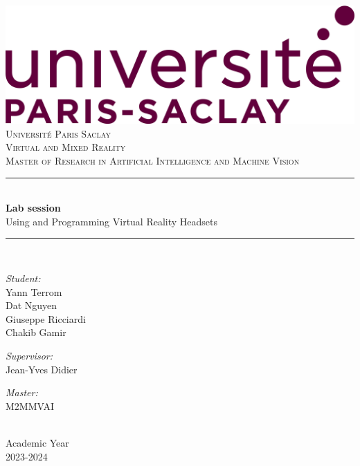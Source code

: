 \documentclass{article}
\begin{document}
\begin{titlepage}

    \centering
    \includegraphics[scale = 0.15]{./logo/upsay.png}\\[1.0 cm]
    \vspace*{3cm}
    \textsc{\LARGE Université Paris Saclay}\\[2.0 cm]
    \textsc{\Large Virtual and Mixed Reality}\\[0.5 cm]
    \textsc{\Large Master of Research in Artificial Intelligence and Machine Vision}\\[0.5 cm]
    \rule{\linewidth}{0.2 mm} \\[0.4 cm]
    { \LARGE \textbf{Lab session} \\[0.4 cm] }
    { \Large {Using and Programming Virtual Reality Headsets} \\[0.4 cm] }
    \rule{\linewidth}{0.2 mm} \\[1.5 cm]
    
\begin{minipage}[t]{0.3\textwidth}
    \begin{flushleft} \large
        \emph{Student:}\\
        Yann Terrom\\
        Dat Nguyen\\
        Giuseppe Ricciardi\\
        Chakib Gamir
    \end{flushleft}
\end{minipage}
\begin{minipage}[t]{0.3\textwidth}
    \begin{center} \large
        \emph{Supervisor:}\\
        Jean-Yves Didier
    \end{center}
\end{minipage}
\begin{minipage}[t]{0.3\textwidth}
    \begin{flushright} \large
        \emph{Master:} \\
        M2MMVAI
    \end{flushright}
\end{minipage}\\[2 cm]
    
    {\large Academic Year}\\
    {2023-2024}	
    
\end{titlepage}
\end{document}
